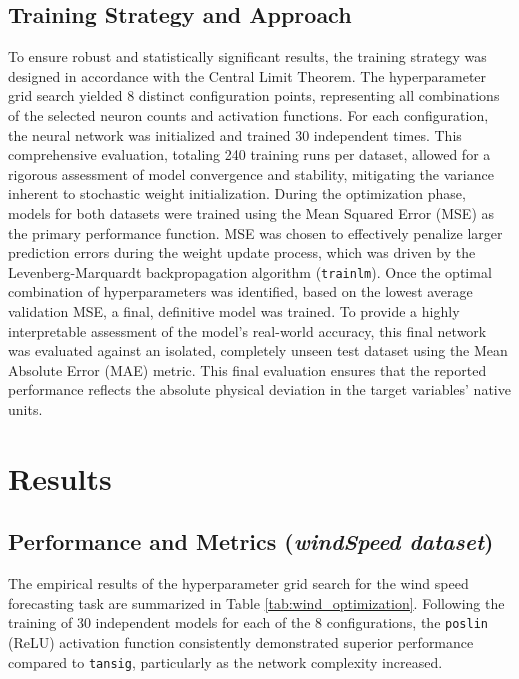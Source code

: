 \documentclass[conference]{IEEEtran}
\begin{document}
\subsection{Training Strategy and Approach}
To ensure robust and statistically significant results, the training strategy was designed in accordance with the Central Limit Theorem. The hyperparameter grid search yielded 8 distinct configuration points, representing all combinations of the selected neuron counts and activation functions. For each configuration, the neural network was initialized and trained 30 independent times. This comprehensive evaluation, totaling 240 training runs per dataset, allowed for a rigorous assessment of model convergence and stability, mitigating the variance inherent to stochastic weight initialization.
During the optimization phase, models for both datasets were trained using the Mean Squared Error (MSE) as the primary performance function. MSE was chosen to effectively penalize larger prediction errors during the weight update process, which was driven by the Levenberg-Marquardt backpropagation algorithm (\texttt{trainlm}). Once the optimal combination of hyperparameters was identified, based on the lowest average validation MSE, a final, definitive model was trained. To provide a highly interpretable assessment of the model's real-world accuracy, this final network was evaluated against an isolated, completely unseen test dataset using the Mean Absolute Error (MAE) metric. This final evaluation ensures that the reported performance reflects the absolute physical deviation in the target variables' native units.


\section{Results}
\subsection{Performance and Metrics (\textit{windSpeed dataset})}
The empirical results of the hyperparameter grid search for the wind speed forecasting task are summarized in Table \ref{tab:wind_optimization}. Following the training of 30 independent models for each of the 8 configurations, the \texttt{poslin} (ReLU) activation function consistently demonstrated superior performance compared to \texttt{tansig}, particularly as the network complexity increased.
\end{document}
